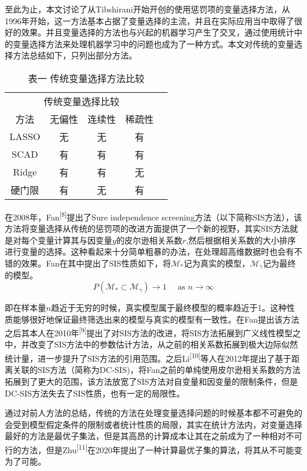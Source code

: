 \documentclass[
]{ctexart}
\begin{document}
至此为止，本文讨论了从Tibshirani开始开创的使用惩罚项的变量选择方法，从1996年开始，这一方法基本占据了变量选择的主流，并且在实际应用当中取得了很好的效果。并且变量选择的方法也与兴起的机器学习产生了交叉，通过使用统计中的变量选择方法来处理机器学习中的问题也成为了一种方式。本文对传统的变量选择方法总结如下，只列出部分方法。

\begin{table}[htb]
\centering
\caption{表一 传统变量选择方法比较}
\begin{tabular}{ccccl}
\cline{1-4}
\multicolumn{4}{c}{传统变量选择比较} &  \\
方法      & 无偏性  & 连续性  & 稀疏性  &  \\ \cline{1-4}
LASSO   & 无    & 无    & 有    &  \\
SCAD    & 有    & 有    & 有    &  \\
Ridge   & 有    & 有    & 无    &  \\
硬门限     & 有    & 无    & 有    &  \\ \cline{1-4}
\end{tabular}
\end{table}

在2008年，Fan\textsuperscript{{[}8{]}}提出了Sure independence
screening方法（以下简称SIS方法），该方法将变量选择从传统的惩罚项的改进方面提供了一个新的视野，其实SIS方法就是对每个变量计算其与因变量\(y\)的皮尔逊相关系数\(r\),然后根据相关系数的大小排序进行变量的选择。这种看起来十分简单粗暴的办法，在处理超高维数据时也会有不错的效果。Fan在其中提出了SIS性质如下，将\(\mathcal{M}_{*}\)记为真实的模型，\(\mathcal{M}_{\gamma}\)记为最终的模型。\[P\left(\mathcal{M}_{*} \subset \mathcal{M}_{\gamma}\right) \rightarrow 1 \quad \text { as } n \rightarrow \infty\]

即在样本量\(n\)趋近于无穷的时候，真实模型属于最终模型的概率趋近于1。这种性质能够很好地保证最终筛选出来的模型与真实的模型有一致性。在Fan提出该方法之后其本人在2010年\textsuperscript{{[}9{]}}提出了对SIS方法的改进，将SIS方法拓展到广义线性模型之中，并改变了SIS方法中的参数估计方法，从之前的相关系数拓展到极大边际似然统计量，进一步提升了SIS方法的引用范围。之后Li\textsuperscript{{[}10{]}}等人在2012年提出了基于距离关联的SIS方法（简称为DC-SIS)，将Fan之前的单纯使用皮尔逊相关系数的方法拓展到了更大的范围，该方法放宽了SIS方法对自变量和因变量的限制条件，但是DC-SIS方法失去了SIS性质，也有一定的局限性。

通过对前人方法的总结，传统的方法在处理变量选择问题的时候基本都不可避免的会受到模型假定条件的限制或者统计性质的局限，其实在统计方法内，对变量选择最好的方法是最优子集法，但是其高昂的计算成本让其在之前成为了一种相对不可行的方法，但是Zhu\textsuperscript{{[}11{]}}在2020年提出了一种计算最优子集的算法，将其从不可能变为了可能。
\end{document}
